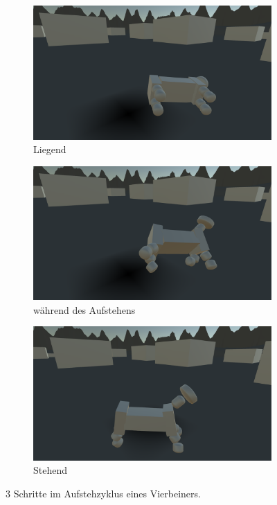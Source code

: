 \begin{figure}
	\centering
	\begin{subfigure}[b]{0.3\textwidth}
		\centering
		\includegraphics[width=\textwidth]{resources/img/4B_Liegend.png}
		\caption{Liegend}
		\label{fig:4B_Liegend}
	\end{subfigure}
	\hfill
	\begin{subfigure}[b]{0.3\textwidth}
		\centering
		\includegraphics[width=\textwidth]{resources/img/4B_Im_Aufstehen.png}
		\caption{während des Aufstehens}
		\label{fig:4B_im_aufstehen}
	\end{subfigure}
	\hfill
	\begin{subfigure}[b]{0.3\textwidth}
		\centering
		\includegraphics[width=\textwidth]{resources/img/4B_Stehend.png}
		\caption{Stehend}
		\label{fig:4B_Stehend}
	\end{subfigure}
	\caption{3 Schritte im Aufstehzyklus eines Vierbeiners.}
	\label{fig:4BAufstehen}
\end{figure}

